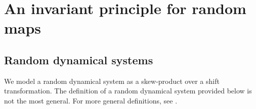\documentclass[a4paper,12pt,reqno]{amsart}
\numberwithin{equation}{section}
\begin{document}
%
%
%
%
%




%

\section{An invariant principle for random maps}
\label{sec:random maps}
\subsection{Random dynamical systems} 
We model a random dynamical system as a skew-product over a shift transformation. The definition of a random dynamical system provided below is not the most general. For more general definitions, see \cite{Arnold:98,Kifer:86}.
\end{document}
